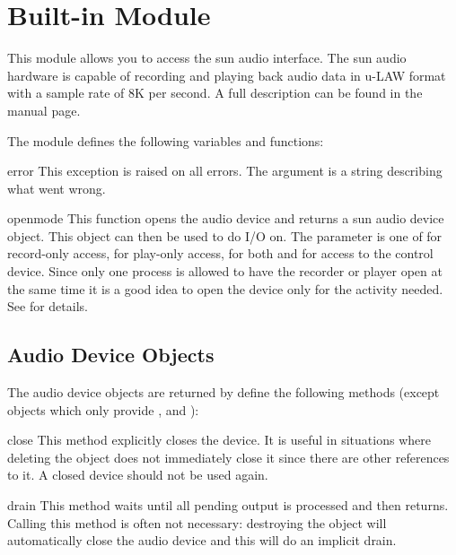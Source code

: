\section{Built-in Module }
\label{module-sunaudiodev}

This module allows you to access the sun audio interface. The sun
audio hardware is capable of recording and playing back audio data
in u-LAW format with a sample rate of 8K per second. A
full description can be found in the  manual page.

The module defines the following variables and functions:

\begin{excdesc}{error}
This exception is raised on all errors. The argument is a string
describing what went wrong.
\end{excdesc}

\begin{funcdesc}{open}{mode}
This function opens the audio device and returns a sun audio device
object. This object can then be used to do I/O on. The  parameter
is one of  for record-only access,  for play-only
access,  for both and  for access to the
control device. Since only one process is allowed to have the recorder
or player open at the same time it is a good idea to open the device
only for the activity needed. See  for details.
\end{funcdesc}


\subsection{Audio Device Objects}
\label{audio-device-objects}

The audio device objects are returned by  define the
following methods (except  objects which only provide
,  and ):

\begin{methoddesc}{close}{}
This method explicitly closes the device. It is useful in situations
where deleting the object does not immediately close it since there
are other references to it. A closed device should not be used again.
\end{methoddesc}

\begin{methoddesc}{drain}{}
This method waits until all pending output is processed and then returns.
Calling this method is often not necessary: destroying the object will
automatically close the audio device and this will do an implicit drain.
\end{methoddesc}

